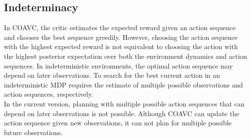   

\subsection{Indeterminacy}
In COAVC, the critic estimates the expected reward given an action sequence and chooses the best sequence greedily. 
However, choosing the action sequence with the highest expected reward is not equivalent to choosing the action with the highest posterior 
expectation over both the environment dynamics and action sequences. In indeterministic environments, the optimal action sequence may depend on later observations. To 
search for the best current action in an indeterministic MDP requires the estimate of multiple possible observations and action sequences, respectively. \\

In the current version, planning with multiple possible action sequences that can depend on later observations is not possible. 
Although COAVC can update the action sequence given new observations, it can not plan for multiple possible future observations.